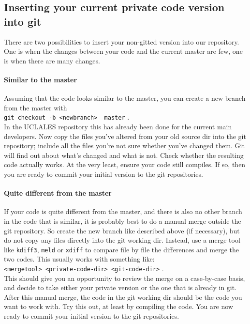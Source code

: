 \documentclass[a4paper,10pt] {article}
\begin{document}
 \subsection{Inserting your current private code version into git} 
There are two possibilities to insert your non-gitted version into our repository. One is when the changes between your code and the current master are few, one is when there are many changes.

 \paragraph*{Similar to the master} 
Assuming that the code looks similar to the master, you can create a new branch from the master with  \\  
\verb|git checkout -b <newbranch>  master| .\\
 In the UCLALES repository this has already been done for the current main developers. Now copy the files you've altered from your old source dir into the git repository; include all the files you're not sure whether you've changed them. Git will find out about what's changed and what is not. Check whether the resulting code actually works. At the very least, ensure your code still compiles. If so, then you are ready to commit your initial version to the git repositories.

 \paragraph* {Quite  different from the master} 
If your code is quite different from the master, and there is also no other branch in the code that is similar, it is probably best to do a manual merge outside the git repository. So create the new branch like described above (if necessary), but do not copy any files directly into the git working dir. Instead, use a merge tool like \verb|kdiff3|, \verb|meld| or \verb|xdiff| to compare file by file the differences and merge the two codes. This usually works with something like: \\
    \verb|<mergetool> <private-code-dir> <git-code-dir>| .\\
 This should give you an opportunity to review the merge on a case-by-case basis, and decide to take either your private version or the one that is already in git. After this manual merge, the code in the git working dir should be the code you want to work with. Try this out, at least by compiling the code. You are now ready to commit your initial version to the git repositories.
\end{document}

